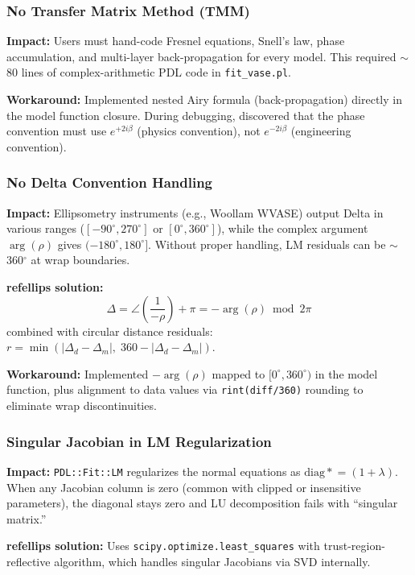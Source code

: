 \documentclass[11pt]{article}
\begin{document}
\subsubsection{No Transfer Matrix Method (TMM)}
\textbf{Impact:} Users must hand-code Fresnel equations, Snell's law,
phase accumulation, and multi-layer back-propagation for every model.
This required $\sim$80 lines of complex-arithmetic PDL code in
\texttt{fit\_vase.pl}.

\textbf{Workaround:} Implemented nested Airy formula (back-propagation)
directly in the model function closure. During debugging, discovered
that the phase convention must use $e^{+2i\beta}$ (physics convention),
not $e^{-2i\beta}$ (engineering convention).

\subsubsection{No Delta Convention Handling}
\textbf{Impact:} Ellipsometry instruments (e.g., Woollam WVASE) output
Delta in various ranges ($[-90^\circ, 270^\circ]$ or $[0^\circ, 360^\circ]$),
while the complex argument $\arg(\rho)$ gives $(-180^\circ, 180^\circ]$.
Without proper handling, LM residuals can be $\sim$360$^\circ$ at
wrap boundaries.

\textbf{refellips solution:}
\begin{equation}
\Delta = \angle\!\left(\frac{1}{-\rho}\right) + \pi = -\arg(\rho) \bmod 2\pi
\end{equation}
combined with circular distance residuals:
$r = \min(|\Delta_d - \Delta_m|,\; 360 - |\Delta_d - \Delta_m|)$.

\textbf{Workaround:} Implemented $-\arg(\rho)$ mapped to $[0^\circ, 360^\circ)$
in the model function, plus alignment to data values via
\texttt{rint(diff/360)} rounding to eliminate wrap discontinuities.

\subsubsection{Singular Jacobian in LM Regularization}
\textbf{Impact:} \texttt{PDL::Fit::LM} regularizes the normal equations as
$\text{diag} \mathrel{*}= (1+\lambda)$. When any Jacobian column is zero
(common with clipped or insensitive parameters), the diagonal stays zero
and LU decomposition fails with ``singular matrix.''

\textbf{refellips solution:} Uses \texttt{scipy.optimize.least\_squares}
with trust-region-reflective algorithm, which handles singular Jacobians
via SVD internally.
\end{document}
